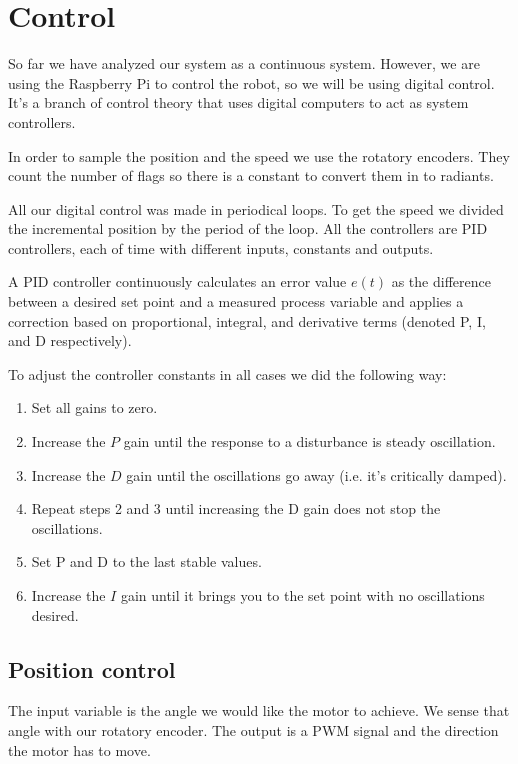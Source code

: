 \section{Control}
So far we have analyzed our system as a continuous system.
However, we are using the Raspberry Pi to control the robot, so we will
be using digital control. It's a branch of control theory that uses
digital computers to act as system controllers.

In order to sample the position and the speed we use the rotatory encoders.
They count the number of flags so there is a constant to convert them in to radiants.

All our digital control was made in periodical loops. To get the speed we
divided the incremental position by the period of the loop. All the controllers
are PID controllers, each of time with different inputs, constants and outputs.

A PID controller continuously calculates an error value $e(t)$ as the difference between
a desired set point and a measured process variable and applies a
correction based on proportional, integral, and derivative terms
(denoted P, I, and D respectively).

To adjust the controller constants in all cases we did the following way:

\begin{enumerate}
    \item Set all gains to zero.
    \item Increase the $P$ gain until the response to a disturbance is steady oscillation.
    \item Increase the $D$ gain until the oscillations go away (i.e. it's critically damped).
    \item Repeat steps 2 and 3 until increasing the D gain does not stop the oscillations.
    \item Set P and D to the last stable values.
    \item Increase the $I$ gain until it brings you to the set point with no oscillations desired.
\end{enumerate}

\subsection{Position control}
The input variable is the angle we would like the motor to achieve. We sense that angle
with our rotatory encoder. The output is a PWM signal and the direction the motor has to move.

